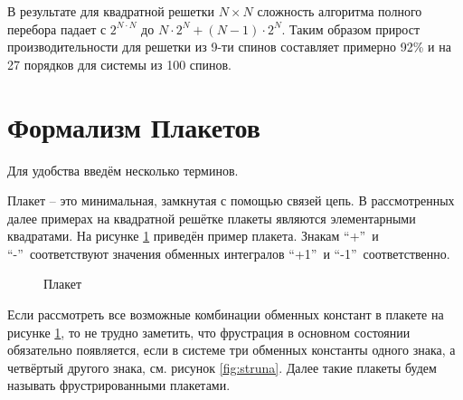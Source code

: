 \documentclass[utf8, babel, sor, jor, amsmath, amssymb, reprint]{elsarticle} %
\begin{document}
В результате для квадратной решетки $N \times N$ сложность алгоритма полного перебора падает с $2^{N \cdot N}$ до $N \cdot 2^N + (N - 1) \cdot 2^N$. Таким образом прирост производительности для решетки из 9-ти спинов составляет примерно 92\% и на 27 порядков для системы из 100 спинов.


\section{Формализм Плакетов}

Для удобства введём несколько терминов.

 Плакет – это минимальная, замкнутая с помощью связей цепь. В рассмотренных далее примерах на квадратной решётке плакеты являются элементарными квадратами. На рисунке \ref{fig:petlya} приведён пример плакета. Знакам \textquotedblleft +\textquotedblright ~и   \textquotedblleft -\textquotedblright ~соответствуют значения обменных интегралов  \textquotedblleft +1\textquotedblright ~и \textquotedblleft -1\textquotedblright ~соответственно.

\begin{figure}[H]
	\centering
	\begin{minipage}{0.3\textwidth}
		\centering
		\caption{Плакет}
		\label{fig:petlya}
	\end{minipage}
\end{figure}
Если рассмотреть все возможные комбинации обменных констант в плакете на рисунке \ref{fig:petlya}, то не трудно заметить, что фрустрация в основном состоянии обязательно появляется, если в системе три обменных константы одного знака, а четвёртый другого знака, см. рисунок \ref{fig:struna}. Далее такие плакеты будем называть фрустрированными плакетами.
\end{document}

